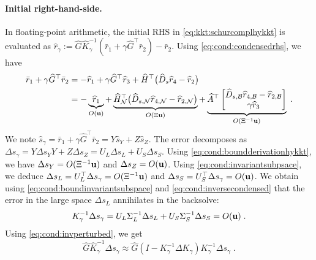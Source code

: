 \paragraph{Initial right-hand-side.}
In floating-point arithmetic, the initial RHS in \eqref{eq:kkt:schurcomplhykkt}
is evaluated as
$\widehat{r}_\gamma :=\widehat{G} \widehat{K}_\gamma^{-1} (\bar{r}_1 + \gamma \widehat{G}^\top \bar{r}_2) - \bar{r}_2$. Using \eqref{eq:cond:condensedrhs}, we have
\begin{equation}
  \label{eq:cond:boundderivationhykkt}
  \begin{aligned}
  \bar{r}_1 + \gamma \widehat{G}^\top \bar{r}_2 &=
- \widehat{r}_1 + \gamma \widehat{G}^\top \widehat{r}_3+ \widehat{H}^\top\big(\widehat{D}_{s} \widehat{r}_{4} - \widehat{r}_{2} \big) \\
&=  -
\underbrace{\widehat{r}_1}_{O(\mathbf{u})} +
\underbrace{
\widehat{H}_{\mathcal{N}}^\top\big(\widehat{D}_{s,\mathcal{N}} \widehat{r}_{4,\mathcal{N}} - \widehat{r}_{2,\mathcal{N}} \big)}_{O(\Xi \mathbf{u})}
+ \underbrace{\widehat{A}^\top \begin{bmatrix}
  \widehat{D}_{s,\mathcal{B}} \widehat{r}_{4,\mathcal{B}} - \widehat{r}_{2,\mathcal{B}}  \\
  \gamma \widehat{r}_3
\end{bmatrix}}_{O(\Xi^{-1}\mathbf{u})} \; .
  \end{aligned}
\end{equation}
We note $\widehat{s}_\gamma = \bar{r}_1 + \gamma \widehat{G}^\top \bar{r}_2 =
Y \widehat{s}_Y + Z \widehat{s}_Z$.
The error decomposes as $\Delta s_\gamma = Y \Delta s_Y Y + Z \Delta s_Z
= U_L \Delta s_L + U_S \Delta s_S$.
Using \eqref{eq:cond:boundderivationhykkt},
we have $\Delta s_Y = O(\Xi^{-1} \mathbf{u})$ and $\Delta s_Z = O(\mathbf{u})$.
Using \eqref{eq:cond:invariantsubpsace}, we deduce
$\Delta s_L = U_L^\top \Delta s_\gamma = O(\Xi^{-1} \mathbf{u})$ and
$\Delta s_S = U_S^\top \Delta s_\gamma = O(\mathbf{u})$.
We obtain using \eqref{eq:cond:boundinvariantsubspace} and \eqref{eq:cond:inversecondensed}
that the error in the large space $\Delta s_L$ annihilates in the backsolve:
\begin{equation}
  \label{eq:cond:boundhykkt1}
  K_\gamma^{-1} \Delta s_\gamma = U_L \Sigma_L^{-1} \Delta s_L + U_S \Sigma_S^{-1} \Delta s_S  = O(\mathbf{u})
  \; .
\end{equation}
Using \eqref{eq:cond:invperturbed}, we get
\begin{equation}
  \widehat{G} \widehat{K}_\gamma^{-1} \Delta s_\gamma \approx
  \widehat{G} (I - K_\gamma^{-1}\Delta K_\gamma) K_\gamma^{-1} \Delta s_\gamma \; .
\end{equation}
